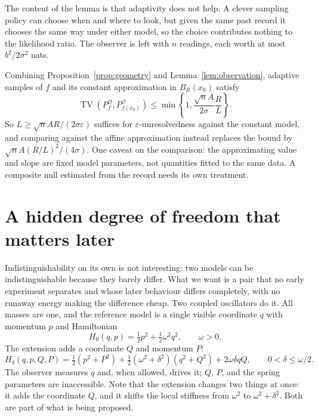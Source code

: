 \documentclass[10pt]{article}
\newcommand{\TV}{\operatorname{TV}}
\newcommand{\eps}{\varepsilon}
\newcommand{\obs}{\mathcal O}
\begin{document}
The content of the lemma is that adaptivity does not help. A clever sampling
policy can choose when and where to look, but given the same past record it
chooses the same way under either model, so the choice contributes nothing to
the likelihood ratio. The observer is left with $n$ readings, each worth at most
$b^2/2\sigma^2$ nats.

Combining Proposition~\ref{prop:geometry} and Lemma~\ref{lem:observation},
adaptive samples of $f$ and its constant approximation in $B_R(x_0)$ satisfy
\begin{equation}
\TV(P_f^{\obs},P_{f(x_0)}^{\obs})
\leq\min\!\left\{1,\frac{\sqrt n A}{2\sigma}\frac RL\right\}.
\label{eq:scale-observation}
\end{equation}
So $L\geq\sqrt n AR/(2\sigma\eps)$ suffices for $\eps$-unresolvedness against
the constant model, and comparing against the affine approximation instead
replaces the bound by $\sqrt n A(R/L)^2/(4\sigma)$. One caveat on the
comparison: the approximating value and slope are fixed model parameters, not
quantities fitted to the same data. A composite null estimated from the record
needs its own treatment.

\section*{A hidden degree of freedom that matters later}
Indistinguishability on its own is not interesting: two models can be
indistinguishable because they barely differ. What we want is a pair that no
early experiment separates and whose later behaviour differs completely, with no
runaway energy making the difference cheap. Two coupled oscillators do it. All
masses are one, and the reference model is a single visible coordinate $q$ with
momentum $p$ and Hamiltonian
\begin{equation}
H_0(q,p)=\tfrac12p^2+\tfrac12\omega^2q^2,
\qquad \omega>0.
\label{eq:H0}
\end{equation}
The extension adds a coordinate $Q$ and momentum $P$:
\begin{equation}
H_\delta(q,p,Q,P)
=\tfrac12(p^2+P^2)+\tfrac12(\omega^2+\delta^2)(q^2+Q^2)
 +2\omega\delta qQ,
\qquad 0<\delta\leq\omega/2.
\label{eq:H1}
\end{equation}
The observer measures $q$ and, when allowed, drives it; $Q$, $P$, and the
spring parameters are inaccessible. Note that the extension changes two things
at once: it adds the coordinate $Q$, and it shifts the local stiffness from
$\omega^2$ to $\omega^2+\delta^2$. Both are part of what is being proposed.
\end{document}
